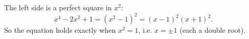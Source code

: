 The left side is a perfect square in $x^2$:
\[x^4-2x^2+1=\left(x^2-1\right)^2=(x-1)^2(x+1)^2 .\]
So the equation holds exactly when $x^2=1$, i.e. $x=\boxed{\pm1}$ (each a double root).
